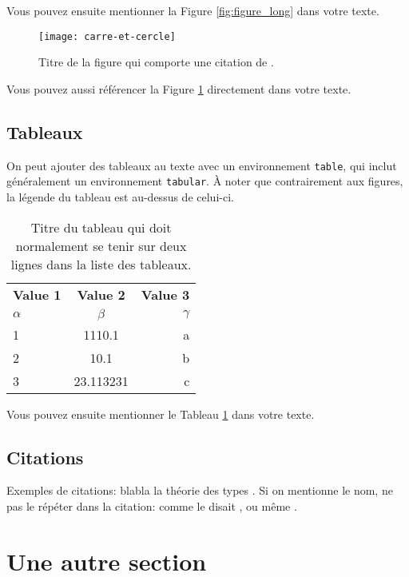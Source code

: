 Vous pouvez ensuite mentionner la Figure \ref{fig:figure_long} dans votre texte.

\begin{figure}
  \centering
  \texttt{[image: carre-et-cercle]}
  \caption[Titre de la figure sans citation]{Titre de la figure qui comporte une citation de \citet{RN6}.}
  \label{fig:figure_cite}
 \end{figure}

Vous pouvez aussi référencer la Figure \ref{fig:figure_cite} directement dans votre texte.

\subsection{Tableaux}

On peut ajouter des tableaux au texte avec un environnement \verb+table+, qui inclut généralement un environnement \verb+tabular+. À noter que contrairement aux figures, la légende du tableau est au-dessus de celui-ci.

\begin{table}
\centering
\caption{Titre du tableau qui doit normalement se tenir sur deux lignes dans la liste des tableaux.}
\label{tab:tab_1}
\begin{tabular}{l|c|r}
  \textbf{Value 1} & \textbf{Value 2} & \textbf{Value 3}\\
  $\alpha$ & $\beta$ & $\gamma$ \\
  \hline
  1 & 1110.1 & a\\
  2 & 10.1 & b\\
  3 & 23.113231 & c\\
\end{tabular}
\end{table}

Vous pouvez ensuite mentionner le Tableau \ref{tab:tab_1} dans votre texte.

\subsection{Citations}

Exemples de citations: blabla la théorie des types
\cite{DBLP:journals/jsyml/Turing48,DBLP:journals/ai/Lenat82}. Si on mentionne
le nom, ne pas le répéter dans la citation: comme le disait
\citeauthor{DBLP:journals/jsyml/Turing48}, ou même
\citeauthor{DBLP:conf/afips/SolomonP76}.

\section{Une autre section}

